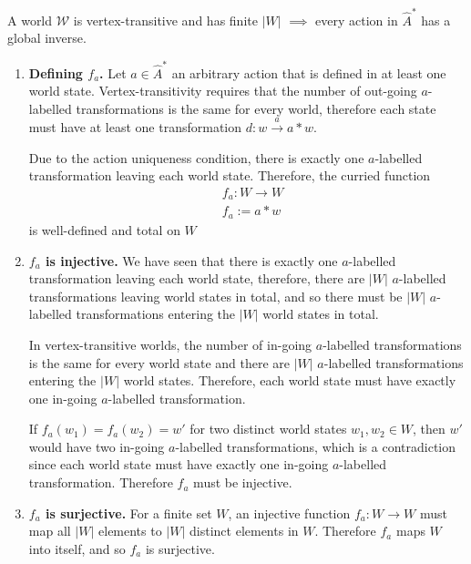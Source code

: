 \begin{propositionE}\label{prp:vertex_transitive_finite_world_has_global_inverses}
     A world $\mathscr{W}$ is vertex-transitive and has finite $|W|$ $\implies$ every action in $\hat{A}^{*}$ has a global inverse.
\end{propositionE}
\begin{proofE}
\begin{enumerate}
    \item \textbf{Defining $f_{a}$.}
    Let $a \in \hat{A}^{*}$ an arbitrary action that is defined in at least one world state.
    Vertex-transitivity requires that the number of out-going $a$-labelled transformations is the same for every world, therefore each state must have at least one transformation $d : w \xrightarrow{a} a \ast w$.

    Due to the action uniqueness condition, there is exactly one $a$-labelled transformation leaving each world state.
    Therefore, the curried function
    \begin{equation}
    \begin{aligned}
        & f_{a}: W \to W \\
        & f_{a} := a \ast w
    \end{aligned}
    \end{equation}
    is well-defined and total on $W$

    \item \textbf{$f_{a}$ is injective.}
    We have seen that there is exactly one $a$-labelled transformation leaving each world state, therefore, there are $|W|$ $a$-labelled transformations leaving world states in total, and so there must be $|W|$ $a$-labelled transformations entering the $|W|$ world states in total.

    In vertex-transitive worlds, the number of in-going $a$-labelled transformations is the same for every world state and there are $|W|$ $a$-labelled transformations entering the $|W|$ world states.
    Therefore, each world state must have exactly one in-going $a$-labelled transformation.

    If $f_{a}(w_{1}) = f_{a}(w_{2}) = w'$ for two distinct world states $w_{1}, w_{2} \in W$, then $w'$ would have two in-going $a$-labelled transformations, which is a contradiction since each world state must have exactly one in-going $a$-labelled transformation.
    Therefore $f_{a}$ must be injective.

    \item \textbf{$f_{a}$ is surjective.}
    For a finite set $W$, an injective function $f_{a}: W \to W$ must map all $|W|$ elements to $|W|$ distinct elements in $W$.
    Therefore $f_{a}$ maps $W$ into itself, and so $f_{a}$ is surjective.


\end{enumerate}
\end{proofE}
